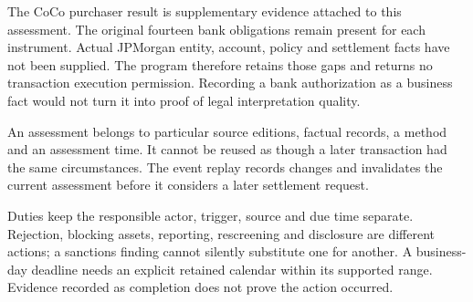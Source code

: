 The CoCo purchaser result is supplementary evidence attached to this assessment.
The original fourteen bank obligations remain present for each instrument.
Actual JPMorgan entity, account, policy and settlement facts have not been
supplied. The program therefore retains those gaps and returns no transaction
execution permission. Recording a bank authorization as a business fact would
not turn it into proof of legal interpretation quality.

\clearpage
{}
An assessment belongs to particular source editions, factual records, a method
and an assessment time. It cannot be reused as though a later transaction had
the same circumstances. The event replay records changes and invalidates the
current assessment before it considers a later settlement request.

\begin{MapDiagram}
\end{MapDiagram}

Duties keep the responsible actor, trigger, source and due time separate.
Rejection, blocking assets, reporting, rescreening and disclosure are different
actions; a sanctions finding cannot silently substitute one for another. A
business-day deadline needs an explicit retained calendar within its supported
range. Evidence recorded as completion does not prove the action occurred.


